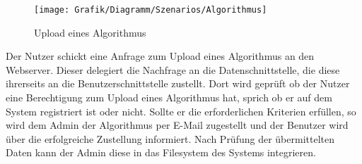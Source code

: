 \begin{figure}[h]
	\hspace{-0.25\linewidth}\texttt{[image: Grafik/Diagramm/Szenarios/Algorithmus]}
	\caption[]{Upload eines Algorithmus}
\end{figure}

\noindent Der Nutzer schickt eine Anfrage zum Upload eines Algorithmus an den Webserver. Dieser delegiert die Nachfrage an die Datenschnittstelle, die diese ihrerseits an die Benutzerschnittstelle zustellt. Dort wird geprüft ob der Nutzer eine Berechtigung zum Upload eines Algorithmus hat, sprich ob er auf dem System registriert ist oder nicht. Sollte er die erforderlichen Kriterien erfüllen, so wird dem Admin der Algorithmus per E-Mail zugestellt und der Benutzer wird über die erfolgreiche Zustellung informiert. Nach Prüfung der übermittelten Daten kann der Admin diese in das Filesystem des Systems integrieren.